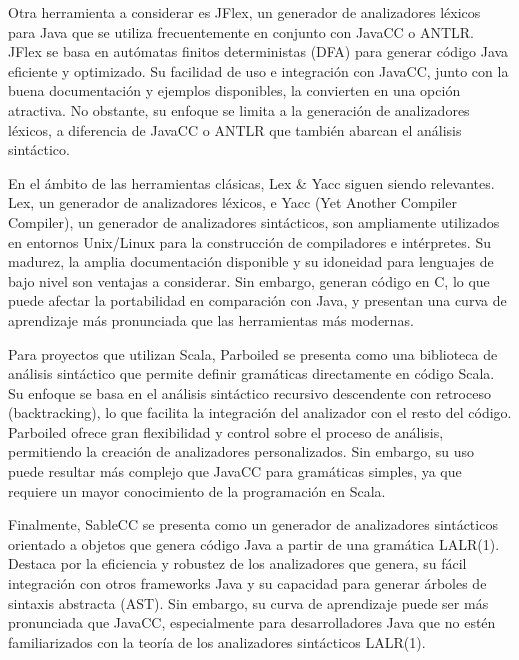Otra herramienta a considerar es JFlex, un generador de analizadores léxicos para Java que se utiliza frecuentemente en conjunto con JavaCC o ANTLR. JFlex se basa en autómatas finitos deterministas (DFA) para generar código Java eficiente y optimizado. Su facilidad de uso e integración con JavaCC, junto con la buena documentación y ejemplos disponibles, la convierten en una opción atractiva. No obstante, su enfoque se limita a la generación de analizadores léxicos, a diferencia de JavaCC o ANTLR que también abarcan el análisis sintáctico.

En el ámbito de las herramientas clásicas, Lex \& Yacc siguen siendo relevantes. Lex, un generador de analizadores léxicos, e Yacc (Yet Another Compiler Compiler), un generador de analizadores sintácticos, son ampliamente utilizados en entornos Unix/Linux para la construcción de compiladores e intérpretes. Su madurez, la amplia documentación disponible y su idoneidad para lenguajes de bajo nivel son ventajas a considerar. Sin embargo, generan código en C, lo que puede afectar la portabilidad en comparación con Java, y presentan una curva de aprendizaje más pronunciada que las herramientas más modernas.

Para proyectos que utilizan Scala, Parboiled se presenta como una biblioteca de análisis sintáctico que permite definir gramáticas directamente en código Scala. Su enfoque se basa en el análisis sintáctico recursivo descendente con retroceso (backtracking), lo que facilita la integración del analizador con el resto del código. Parboiled ofrece gran flexibilidad y control sobre el proceso de análisis, permitiendo la creación de analizadores personalizados. Sin embargo, su uso puede resultar más complejo que JavaCC para gramáticas simples, ya que requiere un mayor conocimiento de la programación en Scala.

Finalmente, SableCC se presenta como un generador de analizadores sintácticos orientado a objetos que genera código Java a partir de una gramática LALR(1). Destaca por la eficiencia y robustez de los analizadores que genera, su fácil integración con otros frameworks Java y su capacidad para generar árboles de sintaxis abstracta (AST). Sin embargo, su curva de aprendizaje puede ser más pronunciada que JavaCC, especialmente para desarrolladores Java que no estén familiarizados con la teoría de los analizadores sintácticos LALR(1).

